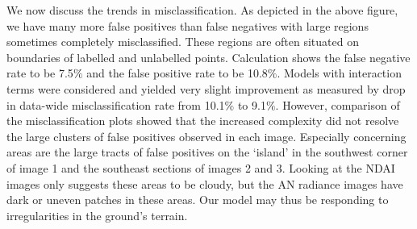 \documentclass{article}\usepackage[]{graphicx}\usepackage[]{color}
\begin{document}
We now discuss the trends in misclassification. As depicted in the above figure, we have many more false positives than false negatives with large regions sometimes completely misclassified. These regions are often situated on boundaries of labelled and unlabelled points. Calculation shows the false negative rate to be 7.5$\%$ and the false positive rate to be 10.8$\%$. Models with interaction terms were considered and yielded very slight improvement as measured by drop in data-wide misclassification rate from 10.1$\%$ to 9.1$\%$. However, comparison of the misclassification plots showed that the increased complexity did not resolve the large clusters of false positives observed in each image. Especially concerning areas are the large tracts of false positives on the `island' in the southwest corner of image 1 and the southeast sections of images 2 and 3. Looking at the NDAI images only suggests these areas to be cloudy, but the AN radiance images have dark or uneven patches in these areas. Our model may thus be responding to irregularities in the ground's terrain.
\end{document}
